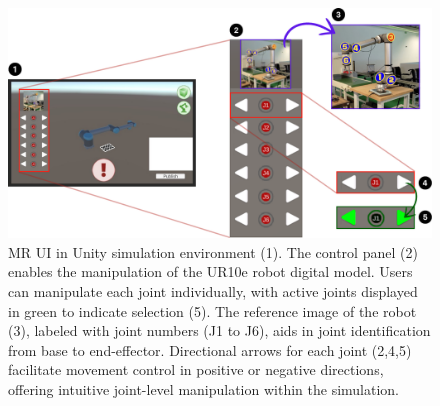 \begin{figure}[h]
    \centering
    \includegraphics[width=\textwidth]{figs/interface-numerada-2.png}
    \caption{\ac{MR} \ac{UI} in Unity simulation environment (1). The control panel (2) enables the manipulation of the UR10e robot digital model. Users can manipulate each joint individually, with active joints displayed in green to indicate selection (5). The reference image of the robot (3), labeled with joint numbers (J1 to J6), aids in joint identification from base to end-effector. Directional arrows for each joint (2,4,5) facilitate movement control in positive or negative directions, offering intuitive joint-level manipulation within the simulation.}
    \label{f:ui-control}
\end{figure}


